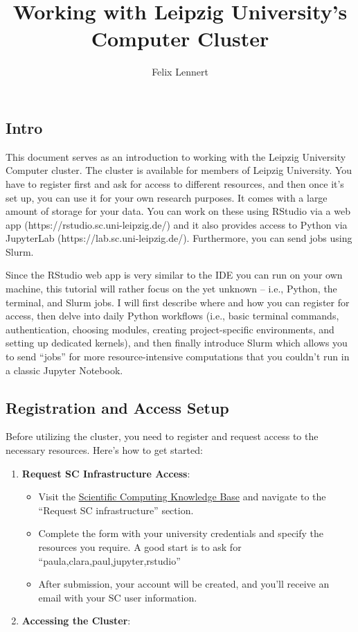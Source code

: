 \documentclass[
  letterpaper,
  DIV=11,
  numbers=noendperiod]{scrartcl}
\title{Working with Leipzig University's Computer Cluster}
\author{Felix Lennert}
\date{}
\providecommand{\tightlist}{%
  \setlength{\itemsep}{0pt}\setlength{\parskip}{0pt}}\usepackage{longtable,booktabs,array}
\begin{document}
\maketitle


\subsection{Intro}\label{intro}

This document serves as an introduction to working with the Leipzig
University Computer cluster. The cluster is available for members of
Leipzig University. You have to register first and ask for access to
different resources, and then once it's set up, you can use it for your
own research purposes. It comes with a large amount of storage for your
data. You can work on these using RStudio via a web app
(https://rstudio.sc.uni-leipzig.de/) and it also provides access to
Python via JupyterLab (https://lab.sc.uni-leipzig.de/). Furthermore, you
can send jobs using Slurm.

Since the RStudio web app is very similar to the IDE you can run on your
own machine, this tutorial will rather focus on the yet unknown -- i.e.,
Python, the terminal, and Slurm jobs. I will first describe where and
how you can register for access, then delve into daily Python workflows
(i.e., basic terminal commands, authentication, choosing modules,
creating project-specific environments, and setting up dedicated
kernels), and then finally introduce Slurm which allows you to send
``jobs'' for more resource-intensive computations that you couldn't run
in a classic Jupyter Notebook.

\subsection{Registration and Access
Setup}\label{registration-and-access-setup}

Before utilizing the cluster, you need to register and request access to
the necessary resources. Here's how to get started:

\begin{enumerate}
\def\labelenumi{\arabic{enumi}.}
\tightlist
\item
  \textbf{Request SC Infrastructure Access}:

  \begin{itemize}
  \tightlist
  \item
    Visit the \href{https://www.sc.uni-leipzig.de/}{Scientific Computing
    Knowledge Base} and navigate to the ``Request SC infrastructure''
    section.
  \item
    Complete the form with your university credentials and specify the
    resources you require. A good start is to ask for
    ``paula,clara,paul,jupyter,rstudio''
  \item
    After submission, your account will be created, and you'll receive
    an email with your SC user information.
  \end{itemize}
\item
  \textbf{Accessing the Cluster}:
\end{enumerate}
\end{document}
